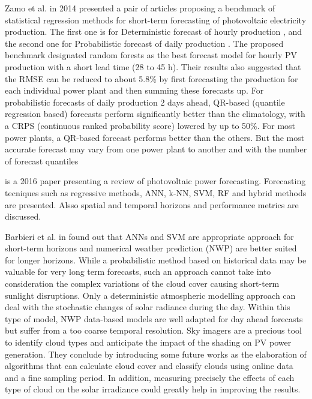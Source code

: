 Zamo et al. in 2014 presented a pair of articles proposing a benchmark of statistical regression methods for short-term forecasting of photovoltaic electricity production.
The first one is for Deterministic forecast of hourly production \cite{ZAMO2014792}, and the second one for Probabilistic forecast of daily production \cite{ZAMO2014804}.
The proposed benchmark designated random forests as the best forecast model for hourly PV production with a short lead time (28 to 45 h).
Their results also suggested that the RMSE can be reduced to about 5.8\% by first forecasting the production for each individual power plant and then summing these forecasts up.
For probabilistic forecasts of daily production 2 days ahead, QR-based (quantile regression based) forecasts perform significantly better than the climatology, with a CRPS (continuous ranked probability score) lowered by up to 50\%.
For most power plants, a QR-based forecast performs better than the others.
But the most accurate forecast may vary from one power plant to another and with the number of forecast quantiles

\cite{ANTONANZAS201678} is a 2016 paper presenting a review of photovoltaic power forecasting.
Forecasting tecniques such as regressive methods, ANN, k-NN, SVM, RF and hybrid methods are presented.
Alsso spatial and temporal horizons and performance metrics are discussed.

Barbieri et al. in \cite{BARBIERI2017242} found out that ANNs and SVM are appropriate approach for short-term horizons and numerical weather prediction (NWP) are better suited for longer horizons.
While a probabilistic method based on historical data may be valuable for very long term forecasts, such an approach cannot take into consideration the complex variations of the cloud cover causing short-term sunlight disruptions.
Only a deterministic atmospheric modelling approach can deal with the stochastic changes of solar radiance during the day.
Within this type of model, NWP data-based models are well adapted for day ahead forecasts but suffer from a too coarse temporal resolution.
Sky imagers are a precious tool to identify cloud types and anticipate the impact of the shading on PV power generation.
They conclude by introducing some future works as the elaboration of algorithms that can calculate cloud cover and classify clouds using online data and a fine sampling period.
In addition, measuring precisely the effects of each type of cloud on the solar irradiance could greatly help in improving the results.

